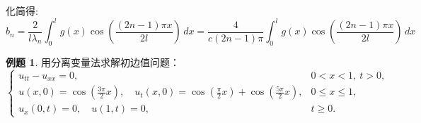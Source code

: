 \documentclass[12pt,a4paper]{article}
\numberwithin{subsection}{section}
\numberwithin{subsubsection}{subsection}
\theoremstyle{plain}
\theoremstyle{definition}
\newtheorem{example}{例题}[subsection]
\theoremstyle{remark}
\begin{document}
	化简得:
	\begin{equation}
		b_n = \frac{2}{l \lambda_n} \int_0^l g(x) \cos\left(\frac{(2n-1)\pi x}{2l}\right) \, dx = \frac{4}{c(2n-1)\pi} \int_0^l g(x) \cos\left(\frac{(2n-1)\pi x}{2l}\right) \, dx
	\end{equation}
	
	\begin{example}
		用分离变量法求解初边值问题：
		\[
		\begin{cases}
			u_{tt} - u_{xx} = 0, & 0 < x < 1, \ t > 0, \\
			u(x,0) = \cos\left(\frac{3\pi}{2}x\right), \quad u_t(x,0) = \cos\left(\frac{\pi}{2}x\right) + \cos\left(\frac{5\pi}{2}x\right), & 0 \leq x \leq 1, \\
			u_x(0,t) = 0, \quad u(1,t) = 0, & t \geq 0.
		\end{cases}
		\]
	\end{example}
\end{document}
